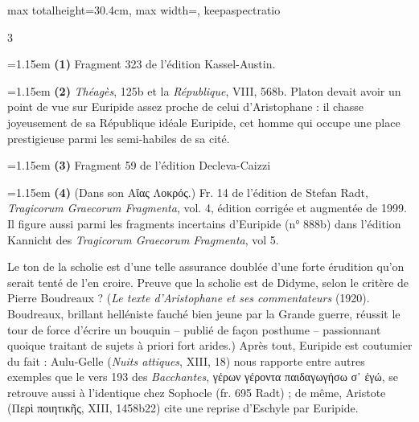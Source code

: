 \documentclass[11pt,twoside]{book}
\newcommand{\italique}[1]{\textit{#1}}
\begin{document}
\begin{adjustbox}{max totalheight=30.4cm, max width=\textwidth, keepaspectratio}
\begin{minipage}{\textwidth}
{\begin{multicols}{3}
\par\vspace{1.5pt}
\noindent\hangindent=1.15em {\color{sepiaNote}\textbf{(1)}} Fragment 323 de l'édition Kassel-Austin.
\par\vspace{1.5pt}
\noindent\hangindent=1.15em {\color{sepiaNote}\textbf{(2)}} \italique{Théagès}, 125b et la \italique{République}, VIII, 568b. Platon devait avoir un point de vue sur Euripide assez proche de celui d'Aristophane : il chasse joyeusement de sa République idéale Euripide, cet homme qui occupe une place prestigieuse parmi les semi-habiles de sa cité.
\par\vspace{1.5pt}
\noindent\hangindent=1.15em {\color{sepiaNote}\textbf{(3)}} Fragment 59 de l'édition Decleva-Caizzi
\par\vspace{1.5pt}
\noindent\hangindent=1.15em {\color{sepiaNote}\textbf{(4)}} (Dans son Αἴας Λοκρός.) Fr. 14 de l'édition de Stefan Radt, \italique{Tragicorum Graecorum Fragmenta}, vol. 4, édition corrigée et augmentée de 1999. Il figure aussi parmi les fragments incertains d'Euripide (n° 888b) dans l'édition Kannicht des \italique{Tragicorum Graecorum Fragmenta}, vol 5.
\par\vspace{1.5pt}
\noindent Le ton de la scholie est d'une telle assurance doublée d'une forte érudition qu'on serait tenté de l'en croire. Preuve que la scholie est de Didyme, selon le critère de Pierre Boudreaux ? (\italique{Le texte d'Aristophane et ses commentateurs} (1920). Boudreaux, brillant helléniste fauché bien jeune par la Grande guerre, réussit le tour de force d'écrire un bouquin -- publié de façon posthume -- passionnant quoique traitant de sujets à priori fort arides.) Après tout, Euripide est coutumier du fait : Aulu-Gelle (\italique{Nuits attiques}, XIII, 18) nous rapporte entre autres exemples que le vers 193 des \italique{Bacchantes}, γέρων γέροντα παιδαγωγήσω σ᾽ ἐγώ, se retrouve aussi à l'identique chez Sophocle (fr. 695 Radt) ; de même, Aristote (Περὶ ποιητικῆς, XIII, 1458b22) cite une reprise d'Eschyle par Euripide.
\par\end{multicols}}
\end{minipage}\end{adjustbox}
\newpage
\end{document}
